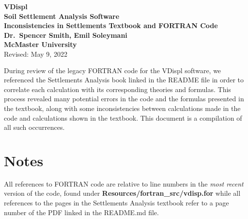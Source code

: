 \documentclass[11pt,fleqn]{article}
\newcommand{\indentpar}{\phantom{=}}
\begin{document}
    \begin{center}

        {\large \textbf{VDispl}}\\[2mm]
        {\large \textbf{Soil Settlement Analysis Software}}\\[2mm]
        {\huge \textbf{Inconsistencies in Settlements Textbook and FORTRAN Code}}\\[6mm]
        {\large \textbf{Dr.~Spencer Smith, Emil Soleymani}}\\[2mm]
        {\large \textbf{McMaster University}}\\[6mm]
        {\large Revised: May 9, 2022}
      
      \end{center}
      
      \medskip

      \indentpar During review of the legacy FORTRAN code for the VDispl software, 
      we referenced the Settlements Analysis book linked in the README 
      file in order to correlate each calculation with its corresponding 
      theories and formulas. This process revealed many potential errors 
      in the code and the formulas presented in the textbook, along with 
      some inconsistencies between calculations made in the code and 
      calculations shown in the textbook. This document is a compilation 
      of all such occurrences.
      
    
    \pagebreak
    

    \section*{Notes}
    \indentpar All references to FORTRAN code are relative to line numbers 
    in the \emph{most recent} version of the code, found under 
    \textbf{Resources/fortran\_src/vdisp.for} while all references to the pages
    in the Settlements Analysis textbook refer to a page number of the PDF linked 
    in the README.md file.

    
    \medskip

\end{document}
